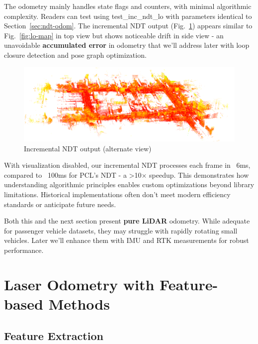 The odometry mainly handles state flags and counters, with minimal algorithmic complexity. Readers can test using test\_inc\_ndt\_lo with parameters identical to Section~\ref{sec:ndt-odom}. The incremental NDT output (Fig.~\ref{fig:ulhk-odom}) appears similar to Fig.~\ref{fig:lo-map} in top view but shows noticeable drift in side view - an unavoidable \textbf{accumulated error} in odometry that we'll address later with loop closure detection and pose graph optimization.

\begin{figure}[!thp]
	\centering
	\includegraphics[width=1.0\textwidth]{resources/3d-lidar-mapping/ulhk-odom}
	\caption{Incremental NDT output (alternate view)}
	\label{fig:ulhk-odom}
\end{figure}

With visualization disabled, our incremental NDT processes each frame in ~6ms, compared to ~100ms for PCL's NDT - a >10× speedup. This demonstrates how understanding algorithmic principles enables custom optimizations beyond library limitations. Historical implementations often don't meet modern efficiency standards or anticipate future needs.

Both this and the next section present \textbf{pure LiDAR} odometry. While adequate for passenger vehicle datasets, they may struggle with rapidly rotating small vehicles. Later we'll enhance them with IMU and RTK measurements for robust performance.

\section{Laser Odometry with Feature-based Methods}  
\subsection{Feature Extraction}  

